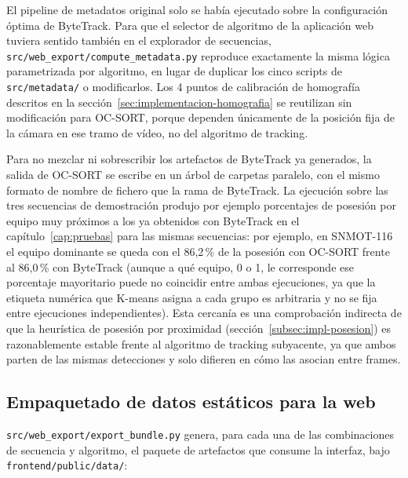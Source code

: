 El pipeline de metadatos original
solo se había ejecutado sobre la configuración óptima de ByteTrack. Para
que el selector de algoritmo de la aplicación web tuviera sentido también
en el explorador de secuencias, \texttt{src/web\_export/compute\_metadata.py}
reproduce exactamente la misma lógica parametrizada por algoritmo, en lugar de duplicar los cinco
scripts de \texttt{src/metadata/} o modificarlos. Los 4 puntos de calibración de
homografía descritos en la sección~\ref{sec:implementacion-homografia}
se reutilizan sin modificación para OC-SORT, porque dependen únicamente
de la posición fija de la cámara en ese tramo de vídeo, no del algoritmo
de tracking.

Para no mezclar ni sobrescribir los artefactos de ByteTrack ya generados, la
salida de OC-SORT se escribe en un árbol de carpetas paralelo,
 con el mismo formato de nombre de fichero que la
rama de ByteTrack. La ejecución sobre las tres secuencias de demostración
produjo por ejemplo porcentajes de posesión por
equipo muy próximos a los ya obtenidos con ByteTrack en el
capítulo~\ref{cap:pruebas} para las mismas secuencias: por ejemplo, en
SNMOT-116 el equipo dominante se queda con el 86,2\,\% de la posesión con
OC-SORT frente al 86,0\,\% con ByteTrack (aunque a qué equipo, 0 o 1, le
corresponde ese porcentaje mayoritario puede no coincidir entre ambas
ejecuciones, ya que la etiqueta numérica que K-means asigna a cada grupo
es arbitraria y no se fija entre ejecuciones independientes). Esta
cercanía es una comprobación indirecta de que la heurística de posesión
por proximidad (sección~\ref{subsec:impl-posesion}) es razonablemente
estable frente al algoritmo de tracking subyacente, ya que ambos parten de
las mismas detecciones y solo difieren en cómo las asocian entre frames.

\subsection{Empaquetado de datos estáticos para la web}
\label{subsec:impl-web-bundle}

\texttt{src/web\_export/export\_bundle.py} genera, para cada una de las
combinaciones de secuencia y algoritmo, el paquete de artefactos que
consume la interfaz, bajo \texttt{frontend/public/data/}:

